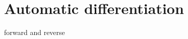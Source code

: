 \documentclass[11pt]{article}
\begin{document}


%
%

\section{Automatic differentiation}

forward and reverse



%


\def\bfe{\bf e}
\def\bfei{{\bf e}_{\it i}}
\def\bfj{\bf j}
\def\bfk{\bf k}
\def\bfn{\bf n}
\def\bfz{\bf 0}
\def\Reals{\mathbb{R}}
\def\pydx{{\tt pydx}}

\newtheorem{theorem}{Theorem}[section]
\newtheorem{lemma}[theorem]{Lemma}
\newtheorem{proposition}[theorem]{Proposition}
\newtheorem{corollary}[theorem]{Corollary}

\newenvironment{definition}[1][Definition]{\begin{trivlist}
\item[\hskip \labelsep {\bfseries #1}]}{\end{trivlist}}
%
\end{document}
